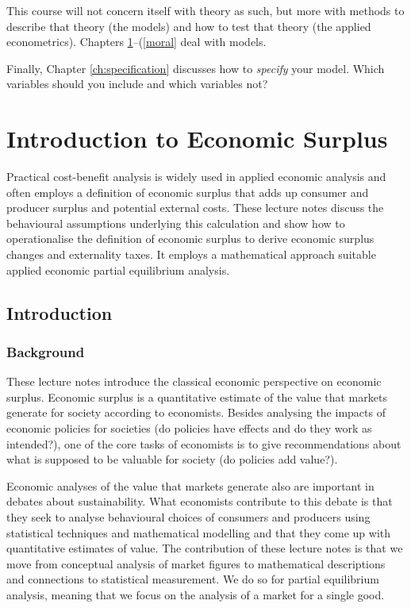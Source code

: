 \documentclass[
]{book}
\begin{document}
This course will not concern itself with theory as such, but more with methods to describe that theory (the models) and how to test that theory (the applied econometrics). Chapters \ref{surplus}--(\ref{moral} deal
with models.

Finally, Chapter \ref{ch:specification} discusses how to \emph{specify} your model. Which variables should you include and which variables not?

\hypertarget{surplus}{%
\chapter{Introduction to Economic Surplus}\label{surplus}}

Practical cost-benefit analysis is widely used in applied economic analysis and often employs a definition of economic surplus that adds up consumer and producer surplus and potential external costs. These lecture notes discuss the behavioural assumptions underlying this calculation and show how to operationalise the definition of economic surplus to derive economic surplus changes and externality taxes. It employs a mathematical approach suitable applied economic partial equilibrium analysis.

\hypertarget{introduction-1}{%
\section{Introduction}\label{introduction-1}}

\hypertarget{background}{%
\subsection{Background}\label{background}}

These lecture notes introduce the classical economic perspective on economic surplus. Economic surplus is a quantitative estimate of the value that markets generate for society according to economists. Besides analysing the impacts of economic policies for societies (do policies have effects and do they work as intended?), one of the core tasks of economists is to give recommendations about what is supposed to be valuable for society (do policies add value?).

Economic analyses of the value that markets generate also are important in debates about sustainability. What economists contribute to this debate is that they seek to analyse behavioural choices of consumers and producers using statistical techniques and mathematical modelling and that they come up with quantitative estimates of value. The contribution of these lecture notes is that we move from conceptual analysis of market figures to mathematical descriptions and connections to statistical measurement. We do so for partial equilibrium analysis, meaning that we focus on the analysis of a market for a single good.
\end{document}
